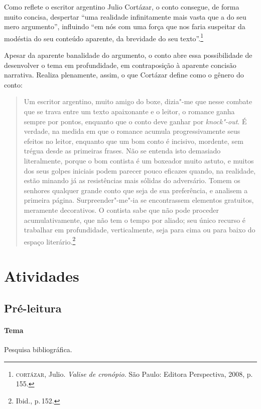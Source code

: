 \documentclass[11pt]{extarticle}
\begin{document}
Como reflete o escritor argentino Julio Cortázar, o conto consegue, de forma muito concisa, despertar ``uma realidade infinitamente mais vasta que a do seu mero argumento'', influindo ``em nós com uma força que nos faria suspeitar da modéstia do seu conteúdo aparente, da brevidade do seu texto''.\footnote{\textsc{cortázar}, Julio. \textit{Valise de cronópio}. São Paulo: Editora Perspectiva, 2008, p.\,155.}

Apesar da aparente banalidade do argumento, o conto abre essa possibilidade de desenvolver o tema em profundidade, em contraposição à aparente concisão narrativa. Realiza plenamente, assim, o que Cortázar define como o gênero do conto:

\begin{quote}
Um escritor argentino, muito amigo do boxe, dizia"-me que nesse combate que se trava entre um texto apaixonante e o leitor, o romance ganha sempre por pontos, enquanto que o conto deve ganhar por \textit{knock"-out}. É verdade, na medida em que o romance acumula progressivamente seus efeitos no leitor, enquanto que um bom conto é incisivo, mordente, sem trégua desde as primeiras frases. Não se entenda isto demasiado literalmente, porque o bom contista é um boxeador muito astuto, e muitos dos seus golpes iniciais podem parecer pouco eficazes quando, na realidade, estão minando já as resistências mais sólidas do adversário.
Tomem os senhores qualquer grande conto que seja de sua preferência, e analisem a primeira página. Surpreender"-me"-ia se encontrassem elementos gratuitos, meramente decorativos. O contista sabe que não pode proceder acumulativamente, que não tem o tempo por aliado; seu único recurso é trabalhar em profundidade, verticalmente, seja para cima ou para baixo do espaço literário.\footnote{Ibid., p.\,152.}
\end{quote}


\section{Atividades}

\subsection{Pré-leitura}

\paragraph{Tema} Pesquisa bibliográfica.
\end{document}
